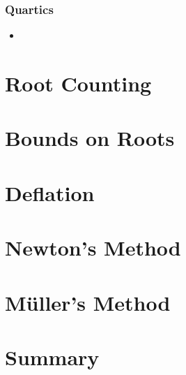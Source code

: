 \documentclass[10pt]{beamer}
\begin{document}
\begin{frame}
  \frametitle{Quartics}
  \begin{itemize}
  \item 
  \end{itemize}
\end{frame}
\section{Root Counting}

\section{Bounds on Roots}

\section{Deflation}

\section{Newton's Method}

\section{M{\"u}ller's Method}

\section{Summary}
\end{document}
